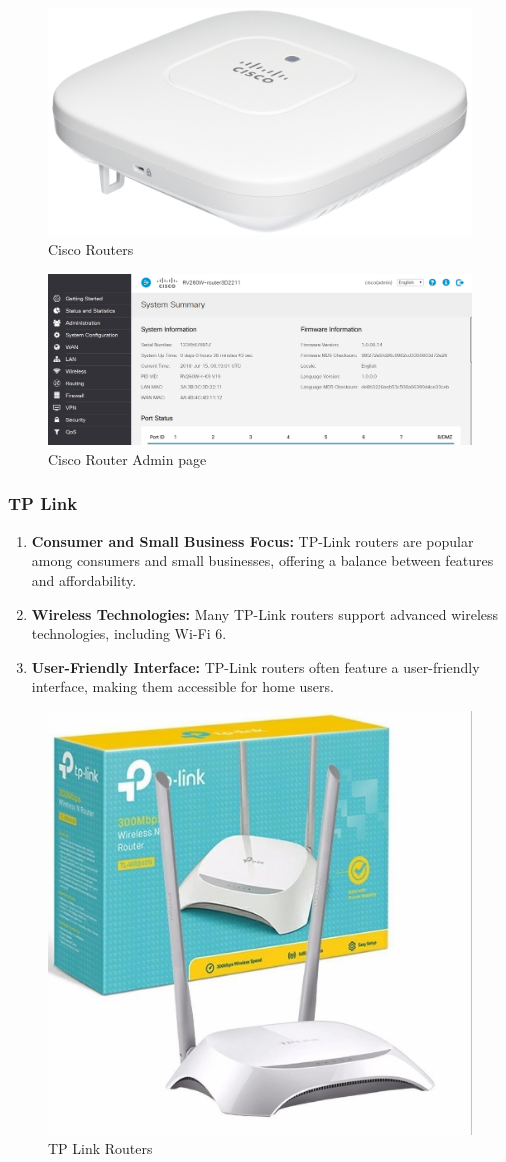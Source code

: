 \documentclass[11pt]{article}
\begin{document}
\begin{figure}[H]
  \centering
  \includegraphics[width=.45\textwidth]{cisco router/cisco router_2.jpg}
  \caption{Cisco Routers}
\end{figure}

\begin{figure}[H]
  \centering
  \includegraphics[width=.95\textwidth]{cisco router admin page/cisco router admin page_0.jpg}
  \caption{Cisco Router Admin page}
\end{figure}

\subsubsection{TP Link}
\begin{enumerate}
  \item \textbf{Consumer and Small Business Focus:} TP-Link routers are popular among consumers and small businesses, offering a balance between features and affordability.

  \item \textbf{Wireless Technologies:} Many TP-Link routers support advanced wireless technologies, including Wi-Fi 6.

  \item \textbf{User-Friendly Interface:} TP-Link routers often feature a user-friendly interface, making them accessible for home users.
\end{enumerate}

\begin{figure}[H]
  \centering
  \includegraphics[width=.45\textwidth]{tp link router/tp link router_7.jpg}
  \caption{TP Link Routers}
\end{figure}
\end{document}
